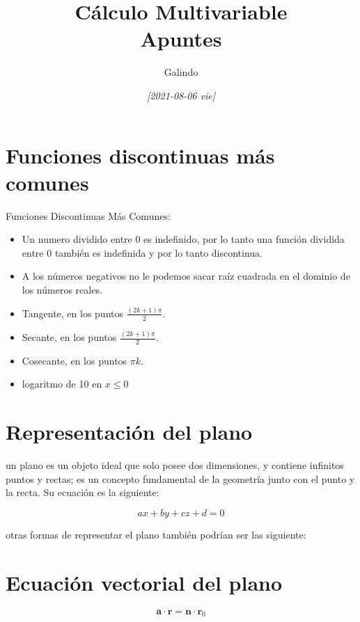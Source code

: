 \documentclass[11pt]{article}
\author{Galindo}
\date{\textit{[2021-08-06 vie]}}
\title{Cálculo Multivariable\\\medskip
\large Apuntes}
\begin{document}
\maketitle
\setcounter{tocdepth}{1}
\tableofcontents

\section{Funciones discontinuas más comunes}
\label{sec:org00616e0}
Funciones Discontinuas Más Comunes:
\begin{itemize}
\item Un numero dividido entre 0 es indefinido, por lo tanto una función dividida entre 0 también es indefinida y por lo tanto discontinua.

\item A los números negativos no le podemos sacar raíz cuadrada en el dominio de los números reales.

\item Tangente, en los puntos \(\frac{(2k + 1)\pi}{2}\).

\item Secante, en los puntos \(\frac{(2k + 1)\pi}{2}\).

\item Cosecante, en los puntos \(\pi k\).

\item logaritmo de 10 en \(x \leq 0\)
\end{itemize}

\section{Representación del plano}
\label{sec:orgadf8828}
un plano es un objeto ideal que solo posee dos dimensiones, y contiene infinitos puntos y rectas; es un concepto fundamental de la geometría junto con el punto y la recta. Su ecuación es la siguiente:

\begin{DEMONSTRATION}
\[
ax + by + cz + d = 0
\]
\end{DEMONSTRATION}

otras formas de representar el plano también podrían ser las siguiente:

\section{Ecuación vectorial del plano}
\label{sec:org28f41b9}
\begin{DEMONSTRATION}
\[
\boldsymbol{a} \cdot \boldsymbol{r} = \boldsymbol{n} \cdot \boldsymbol{r}_0
\]
\end{DEMONSTRATION}
\end{document}
